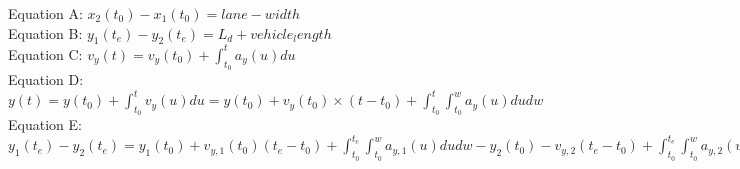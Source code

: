 \documentclass{article}
\begin{document}
	\begin{flushleft}
			Equation A: $x_2(t_0)-x_1(t_0)=lane-width$\\
		Equation B: $y_1(t_e)-y_2(t_e)=L_d+vehicle_length$\\
		Equation C: $v_y(t)=v_y(t_0)+ \int_{t_0}^{t}a_y(u)du$\\
		Equation D: $y(t)=y(t_0)+ \int_{t_0}^{t}v_y(u)du=y(t_0)+v_y(t_0) \times (t-t_0)+ \int_{t_0}^{t}\int_{t_0}^{w}a_y(u)dudw $
		Equation E: $y_1(t_e)-y_2(t_e)=y_1(t_0)+v_{y,1}(t_0)(t_e-t_0)+\int_{t_0}^{t_e}\int_{t_0}^{w}a_{y,1}(u)dudw-y_2(t_0)-v_{y,2}(t_e-t_0)+\int_{t_0}^{t_e}\int_{t_0}^{w}a_{y,2}(u)dudw=\int_{t_0}^{t_e}\int_{t_0}^{w}(a_{y,1}(u)-a_{y,2}(u)dudw=D_{vehicle type}$
	\end{flushleft}

	
	
	
	
	
\end{document}
